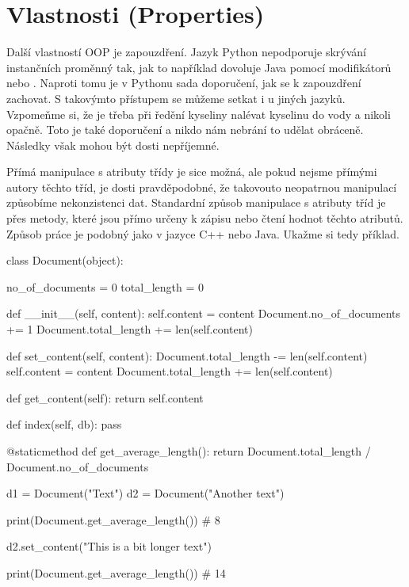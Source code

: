 \section{Vlastnosti (Properties)}

Další vlastností OOP je zapouzdření. Jazyk Python nepodporuje skrývání instančních
proměnný tak, jak to například dovoluje Java pomocí modifikátorů  nebo .
Naproti tomu je v Pythonu sada doporučení, jak se k zapouzdření zachovat. S takovýmto přístupem se můžeme
setkat i u jiných jazyků. Vzpomeňme si, že je třeba při ředění kyseliny nalévat kyselinu do vody
a nikoli opačně. Toto je také doporučení a nikdo nám nebrání to udělat obráceně.
Následky však mohou být dosti nepříjemné.

Přímá manipulace s atributy třídy je sice možná, ale pokud nejsme přímými autory těchto tříd, je dosti
pravděpodobné, že takovouto neopatrnou manipulací způsobíme nekonzistenci dat. Standardní způsob
manipulace s atributy tříd je přes metody, které jsou přímo určeny k zápisu nebo čtení hodnot těchto
atributů. Způsob práce je podobný jako v jazyce C++ nebo Java. Ukažme si tedy příklad.

\begin{python}
class Document(object):
    
    no_of_documents = 0
    total_length = 0

    def __init__(self, content):
        self.content = content
        Document.no_of_documents += 1
        Document.total_length += len(self.content)

    def set_content(self, content):
        Document.total_length -= len(self.content)
        self.content = content
        Document.total_length += len(self.content)

    def get_content(self):
        return self.content

    def index(self, db):
        pass

    @staticmethod
    def get_average_length():
        return Document.total_length / Document.no_of_documents

d1 = Document("Text")
d2 = Document("Another text")

print(Document.get_average_length()) # 8

d2.set_content("This is a bit longer text")

print(Document.get_average_length()) # 14
\end{python}

